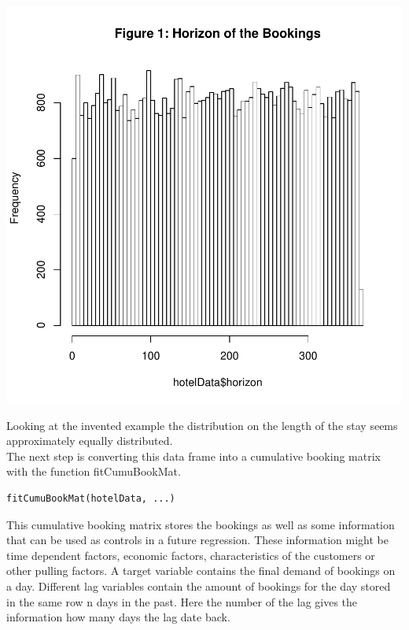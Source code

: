 \documentclass[nojss]{jss}
\begin{document}
\begin{Schunk}
\end{Schunk}
\includegraphics{bookMatrix-tex-002}


Looking at the invented example the distribution on the length of the stay seems approximately equally distributed. \\
The next step is converting this data frame into a cumulative booking matrix with the function fitCumuBookMat. 

\begin{verbatim}
fitCumuBookMat(hotelData, ...)
\end{verbatim}

This cumulative booking matrix stores the bookings as well as some information that can be used as controls in a future regression. These information might be time dependent factors, economic factors, characteristics of the customers or other pulling factors.
A target variable contains the final demand of bookings on a day. Different lag variables contain the amount of bookings for the day stored in the same row n days in the past. Here the number of the lag gives the information how many days the lag date back.
\end{document}
